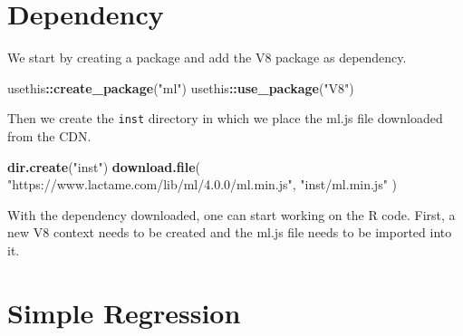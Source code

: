 \documentclass[10pt,]{krantz}
\makeatletter
\newenvironment{Shaded}{\begin{snugshade}}{\end{snugshade}}
\newcommand{\CommentTok}[1]{\textcolor[rgb]{0.37,0.37,0.37}{\textit{#1}}}
\newcommand{\ControlFlowTok}[1]{\textcolor[rgb]{0.27,0.27,0.27}{\textbf{#1}}}
\newcommand{\DataTypeTok}[1]{\textcolor[rgb]{0.27,0.27,0.27}{#1}}
\newcommand{\KeywordTok}[1]{\textcolor[rgb]{0.27,0.27,0.27}{\textbf{#1}}}
\newcommand{\NormalTok}[1]{#1}
\newcommand{\OperatorTok}[1]{\textcolor[rgb]{0.43,0.43,0.43}{\textbf{#1}}}
\newcommand{\OtherTok}[1]{\textcolor[rgb]{0.37,0.37,0.37}{#1}}
\newcommand{\StringTok}[1]{\textcolor[rgb]{0.5,0.5,0.5}{#1}}
\newenvironment{kframe}{%
\medskip{}
\setlength{\fboxsep}{.8em}
 \def\at@end@of@kframe{}%
 \ifinner\ifhmode%
  \def\at@end@of@kframe{\end{minipage}}%
  \begin{minipage}{\columnwidth}%
 \fi\fi%
 \def\FrameCommand##1{\hskip\@totalleftmargin \hskip-\fboxsep
 \colorbox{shadecolor}{##1}\hskip-\fboxsep
     \hskip-\linewidth \hskip-\@totalleftmargin \hskip\columnwidth}%
 \MakeFramed {\advance\hsize-\width
   \@totalleftmargin\z@ \linewidth\hsize
   \@setminipage}}%
 {\par\unskip\endMakeFramed%
 \at@end@of@kframe}
\renewenvironment{Shaded}{\begin{kframe}}{\end{kframe}}
\makeatother
\begin{document}
\hypertarget{v8-ml-dependency}{%
\section{Dependency}\label{v8-ml-dependency}}

We start by creating a package and add the V8 package as dependency.

\begin{Shaded}
\begin{Highlighting}[]
\NormalTok{usethis}\OperatorTok{::}\KeywordTok{create_package}\NormalTok{(}\StringTok{"ml"}\NormalTok{)}
\NormalTok{usethis}\OperatorTok{::}\KeywordTok{use_package}\NormalTok{(}\StringTok{"V8"}\NormalTok{)}
\end{Highlighting}
\end{Shaded}

Then we create the \texttt{inst} directory in which we place the ml.js file downloaded from the CDN.

\begin{Shaded}
\begin{Highlighting}[]
\KeywordTok{dir.create}\NormalTok{(}\StringTok{"inst"}\NormalTok{)}
\KeywordTok{download.file}\NormalTok{(}
  \StringTok{"https://www.lactame.com/lib/ml/4.0.0/ml.min.js"}\NormalTok{, }
  \StringTok{"inst/ml.min.js"}
\NormalTok{)}
\end{Highlighting}
\end{Shaded}

With the dependency downloaded, one can start working on the R code. First, a new V8 context needs to be created and the ml.js file needs to be imported into it.

\begin{Shaded}
\end{Shaded}

\hypertarget{v8-ml-regression}{%
\section{Simple Regression}\label{v8-ml-regression}}
\end{document}
